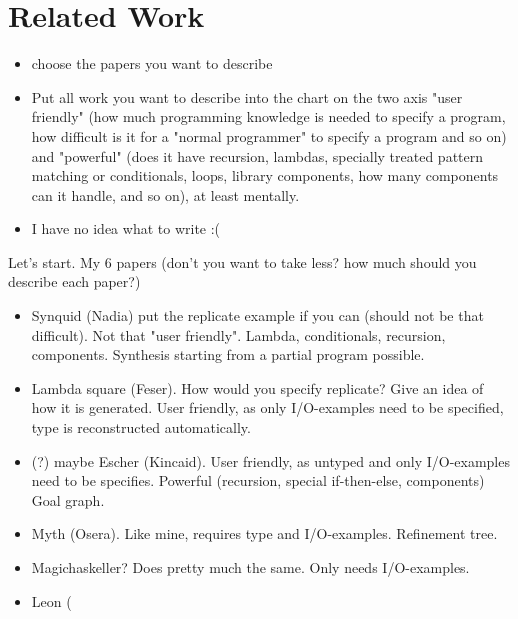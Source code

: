 \chapter{Related Work} \label{relatedwork}


\begin{itemize}
\item choose the papers you want to describe
\item Put all work you want to describe into the chart on the two axis "user friendly" (how much programming knowledge is needed to specify a program, how difficult is it for a "normal programmer" to specify a program and so on) and "powerful" (does it have recursion, lambdas, specially treated pattern matching or conditionals, loops, library components, how many components can it handle, and so on), at least mentally.
\item I have no idea what to write :(
\end{itemize}


Let's start. My 6 papers (don't you want to take less? how much should you describe each paper?)
\begin{itemize}
\item Synquid (Nadia) put the replicate example if you can (should not be that difficult). Not that "user friendly". Lambda, conditionals, recursion, components. Synthesis starting from a partial program possible.
\item Lambda square (Feser). How would you specify replicate? Give an idea of how it is generated. User friendly, as only I/O-examples need to be specified, type is reconstructed automatically.
\item (?) maybe Escher (Kincaid). User friendly, as untyped and only I/O-examples need to be specifies. Powerful (recursion, special if-then-else, components) Goal graph.
\item Myth (Osera). Like mine, requires type and I/O-examples. Refinement tree.
\item Magichaskeller? Does pretty much the same. Only needs I/O-examples.
\item Leon (
\end{itemize}


